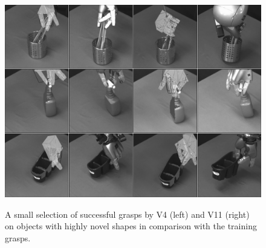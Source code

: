 \begin{figure}[t]
\begin{center}
\includegraphics[width=0.5\columnwidth]{plots/A9A10_vertical.jpg}\\
\caption{A small selection of successful grasps by V4 (left) and V11 (right) on objects with highly novel shapes in comparison with the training grasps. \label{fig:interest}}
\end{center}
\end{figure}




